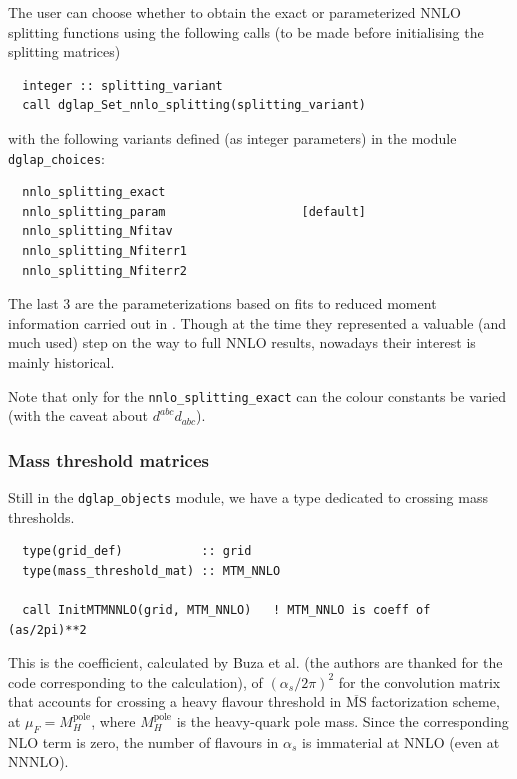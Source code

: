 \documentclass[12pt]{article}
\newcommand{\as}{\alpha_s}
\newcommand{\MSbar}{\overline{\mathrm{MS}}}
\newcommand{\ttt}[1]{\texttt{#1}}
\begin{document}
The user can choose whether to obtain the exact or parameterized NNLO
splitting functions using the following calls (to be made before
initialising the splitting matrices)
\begin{verbatim}
  integer :: splitting_variant
  call dglap_Set_nnlo_splitting(splitting_variant)
\end{verbatim}
with the following variants defined (as integer parameters) in the
module \ttt{dglap\_choices}:
\begin{verbatim}
  nnlo_splitting_exact
  nnlo_splitting_param                   [default]
  nnlo_splitting_Nfitav
  nnlo_splitting_Nfiterr1
  nnlo_splitting_Nfiterr2
\end{verbatim}
The last 3 are the parameterizations based on fits to reduced moment
information carried out in \cite{vanNeerven:1999ca,vanNeerven:2000uj}.
Though at the time they represented a valuable (and much used) step on
the way to full NNLO results, nowadays their interest is mainly
historical.

Note that only for the \ttt{nnlo\_splitting\_exact} can the colour
constants be varied (with the caveat about $d^{abc}d_{abc}$).



\subsubsection{Mass threshold matrices}
\label{sec:mtm}

Still in the \ttt{dglap\_objects} module, we have a type dedicated to
crossing mass thresholds.
\begin{verbatim}
  type(grid_def)           :: grid
  type(mass_threshold_mat) :: MTM_NNLO

  call InitMTMNNLO(grid, MTM_NNLO)   ! MTM_NNLO is coeff of (as/2pi)**2
\end{verbatim}
This is the coefficient, calculated by Buza et al. \cite{NNLO-MTM}
(the authors are thanked for the code corresponding to the
calculation), of $(\as/2\pi)^2$ for the convolution matrix that
accounts for crossing a heavy flavour threshold in $\MSbar$
factorization scheme, at $\mu_F = M_H^\mathrm{pole}$, where
$M_H^\mathrm{pole}$ is the heavy-quark pole mass. Since the
corresponding NLO term is zero, the number of flavours in $\as$ is
immaterial at NNLO (even at NNNLO).
\end{document}
